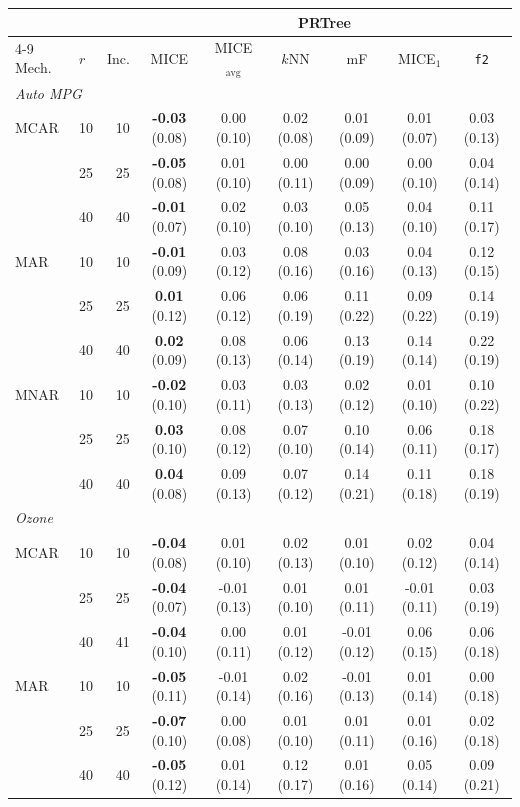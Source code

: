 \begin{tabular}{llrcccccc}
\toprule
 & & & \multicolumn{6}{c}{PRTree}\\
\cmidrule(lr){4-9}
Mech. & $r$ & Inc. & MICE & MICE$_{\mathrm{avg}}$ & $k$NN & mF & MICE$_1$ & \texttt{f2}\\
\midrule
\multicolumn{9}{l}{\textit{Auto MPG}}\\
MCAR & 10 & 10 & \textbf{-0.03} (0.08) & 0.00 (0.10) & 0.02 (0.08) & 0.01 (0.09) & 0.01 (0.07) & 0.03 (0.13)\\
 & 25 & 25 & \textbf{-0.05} (0.08) & 0.01 (0.10) & 0.00 (0.11) & 0.00 (0.09) & 0.00 (0.10) & 0.04 (0.14)\\
 & 40 & 40 & \textbf{-0.01} (0.07) & 0.02 (0.10) & 0.03 (0.10) & 0.05 (0.13) & 0.04 (0.10) & 0.11 (0.17)\\
MAR & 10 & 10 & \textbf{-0.01} (0.09) & 0.03 (0.12) & 0.08 (0.16) & 0.03 (0.16) & 0.04 (0.13) & 0.12 (0.15)\\
 & 25 & 25 & \textbf{0.01} (0.12) & 0.06 (0.12) & 0.06 (0.19) & 0.11 (0.22) & 0.09 (0.22) & 0.14 (0.19)\\
 & 40 & 40 & \textbf{0.02} (0.09) & 0.08 (0.13) & 0.06 (0.14) & 0.13 (0.19) & 0.14 (0.14) & 0.22 (0.19)\\
MNAR & 10 & 10 & \textbf{-0.02} (0.10) & 0.03 (0.11) & 0.03 (0.13) & 0.02 (0.12) & 0.01 (0.10) & 0.10 (0.22)\\
 & 25 & 25 & \textbf{0.03} (0.10) & 0.08 (0.12) & 0.07 (0.10) & 0.10 (0.14) & 0.06 (0.11) & 0.18 (0.17)\\
 & 40 & 40 & \textbf{0.04} (0.08) & 0.09 (0.13) & 0.07 (0.12) & 0.14 (0.21) & 0.11 (0.18) & 0.18 (0.19)\\
\midrule
\multicolumn{9}{l}{\textit{Ozone}}\\
MCAR & 10 & 10 & \textbf{-0.04} (0.08) & 0.01 (0.10) & 0.02 (0.13) & 0.01 (0.10) & 0.02 (0.12) & 0.04 (0.14)\\
 & 25 & 25 & \textbf{-0.04} (0.07) & -0.01 (0.13) & 0.01 (0.10) & 0.01 (0.11) & -0.01 (0.11) & 0.03 (0.19)\\
 & 40 & 41 & \textbf{-0.04} (0.10) & 0.00 (0.11) & 0.01 (0.12) & -0.01 (0.12) & 0.06 (0.15) & 0.06 (0.18)\\
MAR & 10 & 10 & \textbf{-0.05} (0.11) & -0.01 (0.14) & 0.02 (0.16) & -0.01 (0.13) & 0.01 (0.14) & 0.00 (0.18)\\
 & 25 & 25 & \textbf{-0.07} (0.10) & 0.00 (0.08) & 0.01 (0.10) & 0.01 (0.11) & 0.01 (0.16) & 0.02 (0.18)\\
 & 40 & 40 & \textbf{-0.05} (0.12) & 0.01 (0.14) & 0.12 (0.17) & 0.01 (0.16) & 0.05 (0.14) & 0.09 (0.21)\\

\end{tabular}
